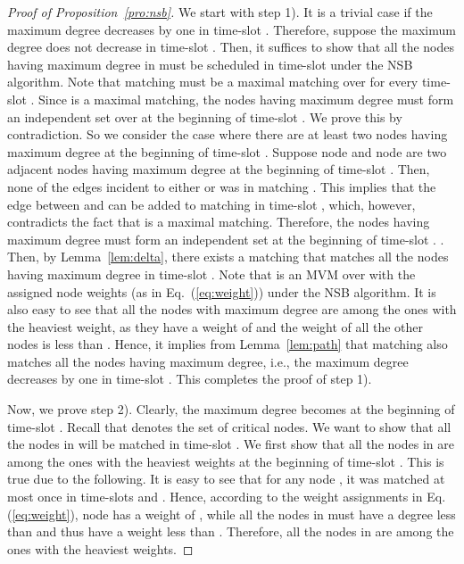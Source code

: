 \documentclass[10pt,journal,compsoc]{IEEEtran}
\newcommand{\high}[1]{{\color{black}{#1}}}
\begin{document}
\begin{proof}[Proof of Proposition~\ref{pro:nsb}]
We start with step 1). It is a trivial case if the maximum degree decreases by one in time-slot . 
Therefore, suppose the maximum degree does not decrease in time-slot . Then, it suffices to 
show that all the nodes having maximum degree  in  must be scheduled in 
time-slot  under the NSB algorithm. Note that matching  must be a maximal matching 
over  for every time-slot . Since  is a maximal matching, the nodes having 
maximum degree must form an independent set over  at the beginning of time-slot 
. We prove this by contradiction. 
\high{Note that if there is only one node having maximum degree at the beginning of time-slot , 
then it is trivial that the subgraph induced by this single node must consist of this node itself only and 
thus forms an independent set.} 
So we consider the case where there are at 
least two nodes having maximum degree at the beginning of time-slot . Suppose node  
and node  are two adjacent nodes having maximum degree  at the beginning of time-slot 
. Then, none of the edges incident to either  or  was in matching . This implies 
that the edge between  and  can be added to matching  in time-slot , which, however, 
contradicts the fact that  is a maximal matching. Therefore, the nodes having maximum degree 
must form an independent set at the beginning of time-slot . 
\high{Clearly, the subgraph induced by all the nodes having maximum degree forms an independent set 
and thus has no edges. In this case, it is trivial that this induced subgraph is bipartite}. 
Then, by Lemma~\ref{lem:delta}, there exists a matching \high{over } that matches all the 
nodes having maximum degree 
in time-slot . Note that  is an MVM over  with the assigned node weights 
(as in Eq.~(\ref{eq:weight})) under the NSB algorithm. It is also easy to see that all the nodes with 
maximum degree  are among the ones with the heaviest weight, as they have a weight of 
 and the weight of all the other nodes is less than . Hence, it implies from 
Lemma~\ref{lem:path} that matching  also matches all the nodes having maximum degree, 
i.e., the maximum degree decreases by one in time-slot . This completes the proof of step 1).

Now, we prove step 2).
Clearly, the maximum degree becomes  at the beginning of time-slot . Recall
that  denotes the set of critical nodes. We want to show that all the nodes in 
 will be matched in time-slot . We first show that all the nodes in  
are among the ones with the heaviest weights at the beginning of time-slot . This is true 
due to the following. It is easy to see that for any node , it was matched at most 
once in time-slots  and . Hence, according to the weight assignments in Eq. (\ref{eq:weight}), 
node  has a weight of , while all the nodes in  must 
have a degree less than  and thus have a weight less than . Therefore, 
all the nodes in  are among the ones with the heaviest weights.


\end{proof}
\end{document}
